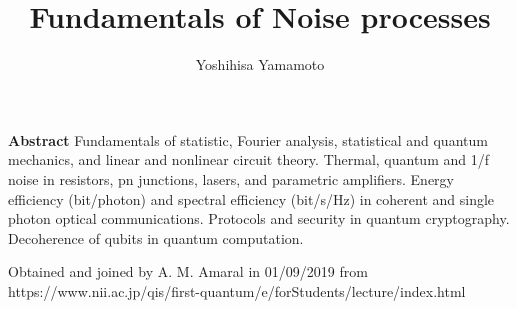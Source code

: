 \documentclass{article}
\title{Fundamentals of Noise processes}
\author{Yoshihisa Yamamoto}
\date{}
\begin{document}
\maketitle

{\bf Abstract} Fundamentals of statistic, Fourier analysis, statistical and quantum mechanics, and linear and nonlinear circuit theory. Thermal, quantum and 1/f noise in resistors, pn junctions, lasers, and parametric amplifiers. Energy efficiency (bit/photon) and spectral efficiency (bit/s/Hz) in coherent and single photon optical communications. Protocols and security in quantum cryptography. Decoherence of qubits in quantum computation.

Obtained and joined by A. M. Amaral in 01/09/2019 from https://www.nii.ac.jp/qis/first-quantum/e/forStudents/lecture/index.html


















\end{document}
